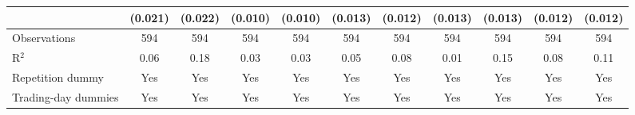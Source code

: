 \begin{tabular}{lcccccccccc}
                       & (0.021)       & (0.022)       & (0.010)       & (0.010)       & (0.013)        & (0.012)        & (0.013)       & (0.013)        & (0.012)        & (0.012)\\   
   \midrule
   Observations        & 594           & 594           & 594           & 594           & 594            & 594            & 594           & 594            & 594            & 594\\  
   R$^2$               & 0.06          & 0.18          & 0.03          & 0.03          & 0.05           & 0.08           & 0.01          & 0.15           & 0.08           & 0.11\\  
   Repetition dummy    & Yes           & Yes           & Yes           & Yes           & Yes            & Yes            & Yes           & Yes            & Yes            & Yes\\  
   Trading-day dummies & Yes           & Yes           & Yes           & Yes           & Yes            & Yes            & Yes           & Yes            & Yes            & Yes\\  
   \midrule \midrule
\end{tabular}

